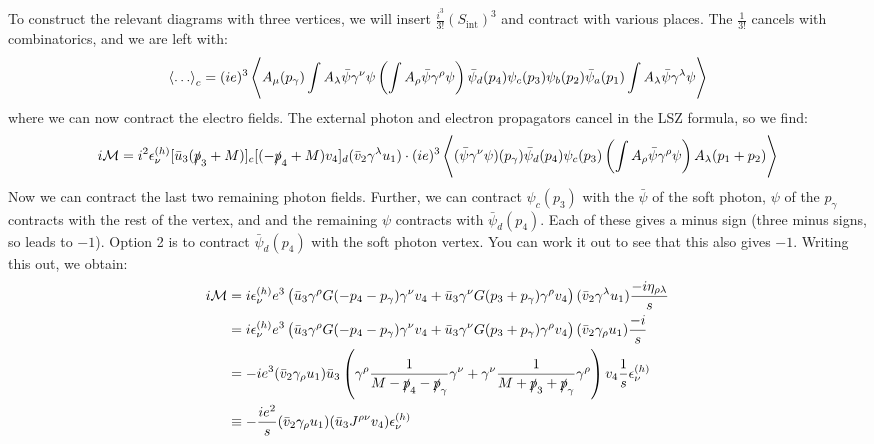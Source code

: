 To construct the relevant diagrams with three vertices, we will insert $\frac{i^3}{3!}(S_{\text{int}})^3$ and contract with various places. The $\frac{1}{3!}$ cancels with combinatorics, and we are left with:
\begin{equation}
    \left< \ldots \right>_c = (ie)^3\left< A_\mu(p_\gamma)\int A_\lambda \bar{\psi}\gamma^\nu\psi \left(\int A_\rho \bar{\psi}\gamma^\rho \psi\right) \bar{\psi}_d(p_4)\psi_c(p_3)\psi_b(p_2)\bar{\psi}_a(p_1)\int A_\lambda \bar{\psi}\gamma^\lambda \psi \right>
\end{equation}
where we can now contract the electro fields. The external photon and electron propagators cancel in the LSZ formula, so we find:
\begin{equation}
    i\mathcal{M} = i^2\epsilon^{(h)}_\nu[\bar{u}_3(\slashed{p}_3 + M)]_c[(-\slashed{p}_4 + M)v_4]_d (\bar{v}_2\gamma^\lambda u_1) \cdot (ie)^3\left< (\bar{\psi}\gamma^\nu \psi)(p_\gamma)\bar{\psi}_d(p_4)\psi_c(p_3)\left(\int A_\rho \bar{\psi}\gamma^\rho \psi\right)A_\lambda(p_1 + p_2) \right>
\end{equation}
Now we can contract the last two remaining photon fields. Further, we can contract $\psi_c(p_3)$ with the $\bar{\psi}$ of the soft photon, $\psi$ of the $p_\gamma$ contracts with the rest of the vertex, and and the remaining $\psi$ contracts with $\bar{\psi}_d(p_4)$. Each of these gives a minus sign (three minus signs, so leads to $-1$). Option 2 is to contract $\bar{\psi}_d(p_4)$ with the soft photon vertex. You can work it out to see that this also gives $-1$. Writing this out, we obtain:
\begin{equation}
    \begin{split}
        i\mathcal{M} &= i\epsilon^{(h)}_\nu e^3\left(\bar{u}_3\gamma^\rho G(-p_4 - p_\gamma)\gamma^\nu v_4 + \bar{u}_3\gamma^\nu G(p_3 + p_\gamma)\gamma^\rho v_4\right)(\bar{v}_2\gamma^\lambda u_1)\frac{-i\eta_{\rho\lambda}}{s}
        \\ &= i\epsilon^{(h)}_\nu e^3\left(\bar{u}_3\gamma^\rho G(-p_4 - p_\gamma)\gamma^\nu v_4 + \bar{u}_3\gamma^\nu G(p_3 + p_\gamma)\gamma^\rho v_4\right)(\bar{v}_2\gamma_\rho u_1)\frac{-i}{s}
        \\ &= -ie^3(\bar{v}_2\gamma_\rho u_1)\bar{u}_3\left(\gamma^\rho \frac{1}{M - \slashed{p}_4 - \slashed{p}_\gamma}\gamma^\nu  + \gamma^\nu \frac{1}{M + \slashed{p}_3 + \slashed{p}_\gamma}\gamma^\rho\right)v_4\frac{1}{s}\epsilon^{(h)}_\nu
        \\ &\equiv -\frac{ie^2}{s}(\bar{v}_2\gamma_\rho u_1)(\bar{u}_3J^{\rho\nu}v_4)\epsilon^{(h)}_\nu
    \end{split}
\end{equation}
